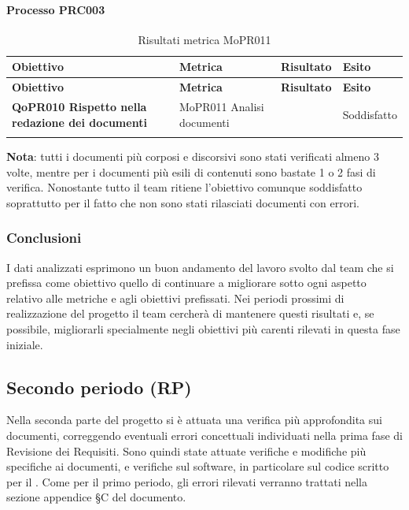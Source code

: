 \documentclass[../piano-di-qualifica.tex]{subfiles}
\begin{document}
\paragraph{Processo PRC003}
\label{sub:processo_PRC003}

\renewcommand{\arraystretch}{2} %
\begin{longtable}[H]{>{\centering\bfseries}m{5cm} >{\centering}m{5cm} >{\centering}m{2.5cm} >{\centering\arraybackslash}m{2.5cm}}  
  \rowcolor{lightgray}
  {\textbf{Obiettivo}} & {\textbf{Metrica}} & {\textbf{Risultato}} & {\textbf{Esito}}  \\
  \endfirsthead%
  \rowcolor{lightgray}
  {\textbf{Obiettivo}} & {\textbf{Metrica}} & {\textbf{Risultato}} & {\textbf{Esito}}  \\
  \endhead%
  \textbf{QoPR010 Rispetto nella redazione dei documenti} & MoPR011 Analisi documenti & 3 & Soddisfatto \\
  \caption{Risultati metrica MoPR011}
  \label{tab:my-table}
\end{longtable}
\textbf{Nota}: tutti i documenti più corposi e discorsivi sono stati verificati almeno 3 volte, mentre per i documenti più esili di contenuti sono bastate 1 o 2 fasi di verifica. Nonostante tutto il team ritiene l'obiettivo comunque soddisfatto soprattutto per il fatto che non sono stati rilasciati documenti con errori.

\subsubsection{Conclusioni}%
\label{sub:conclusioni}
I dati analizzati esprimono un buon andamento del lavoro svolto dal team che si prefissa come obiettivo quello di continuare a migliorare sotto ogni aspetto relativo alle metriche e agli obiettivi prefissati.
Nei periodi prossimi di realizzazione del progetto il team cercherà di mantenere questi risultati e, se possibile, migliorarli specialmente negli obiettivi più carenti rilevati in questa fase iniziale.

\subsection{Secondo periodo (RP)}
\label{sub:secondo_periodo}
Nella seconda parte del progetto si è attuata una verifica più approfondita sui documenti, correggendo eventuali errori concettuali individuati nella prima fase di Revisione dei Requisiti.
Sono quindi state attuate verifiche e modifiche più specifiche ai documenti, e verifiche sul software, in particolare sul codice scritto per il .
Come per il primo periodo, gli errori rilevati verranno trattati nella sezione appendice §C del documento.
\end{document}
